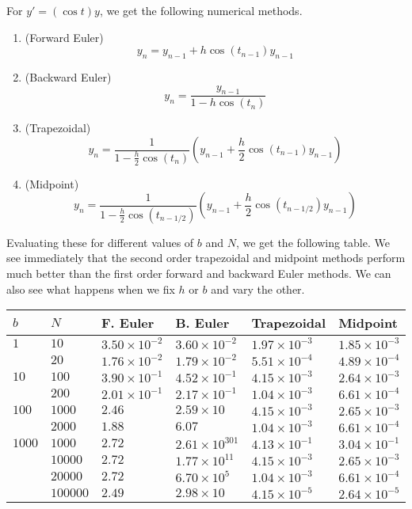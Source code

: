 \begin{solution}
  For $y' = (\cos t) y$, we get the following numerical methods.
  \begin{enumerate}
    \item (Forward Euler)
    \[
      y_n = y_{n-1} + h \cos(t_{n-1})y_{n-1}
    \]
    \item (Backward Euler)
    \[
      y_n = \frac{y_{n-1}}{1 - h \cos(t_n)}
    \]
    \item (Trapezoidal)
    \[
      y_n = \frac{1}{1 - \frac{h}{2}\cos(t_n)}\left(y_{n-1} + \frac{h}{2} \cos(t_{n-1}) y_{n-1}\right)
    \]
    \item (Midpoint)
    \[
      y_n = \frac{1}{1 - \frac{h}{2} \cos(t_{n-1/2})}\left(y_{n-1} + \frac{h}{2} \cos(t_{n-1/2}) y_{n-1}\right)
    \]
  \end{enumerate}
  Evaluating these for different values of $b$ and $N$, we get the following table. We see immediately that the second order trapezoidal and midpoint methods perform much better than the first order forward and backward Euler methods. We can also see what happens when we fix $h$ or $b$ and vary the other.
  
  \begin{table}[!ht]
    \label{tab:main}
    \centering
    \begin{tabular}{|llllll|}
      \hline
      $b$    & $N$      & F. Euler    & B. Euler       & Trapezoidal & Midpoint \\
      \hline
      $1$    & $10$     & $3.50 \times 10^{-2}$ & $3.60 \times 10^{-2}$   & $1.97 \times 10^{-3}$ & $1.85 \times 10^{-3}$ \\
             & $20$     & $1.76 \times 10^{-2}$ & $1.79 \times 10^{-2}$   & $5.51 \times 10^{-4}$ & $4.89 \times 10^{-4}$ \\
      $10$   & $100$    & $3.90 \times 10^{-1}$ & $4.52 \times 10^{-1}$   & $4.15 \times 10^{-3}$ & $2.64 \times 10^{-3}$ \\
             & $200$    & $2.01 \times 10^{-1}$ & $2.17 \times 10^{-1}$   & $1.04 \times 10^{-3}$ & $6.61 \times 10^{-4}$ \\
      $100$  & $1000$   & $2.46$                & $2.59 \times 10$        & $4.15 \times 10^{-3}$ & $2.65 \times 10^{-3}$ \\
             & $2000$   & $1.88$                & $6.07$                  & $1.04 \times 10^{-3}$ & $6.61 \times 10^{-4}$ \\
      $1000$ & $1000$   & $2.72$                & $2.61 \times 10^{301}$  & $4.13 \times 10^{-1}$ & $3.04 \times 10^{-1}$ \\
             & $10000$  & $2.72$                & $1.77 \times 10^{11}$   & $4.15 \times 10^{-3}$ & $2.65 \times 10^{-3}$ \\
             & $20000$  & $2.72$                & $6.70 \times 10^{5}$    & $1.04 \times 10^{-3}$ & $6.61 \times 10^{-4}$ \\
             & $100000$ & $2.49$                & $2.98 \times 10$        & $4.15 \times 10^{-5}$ & $2.64 \times 10^{-5}$ \\
      \hline
    \end{tabular}
  \end{table}
  

\end{solution}
